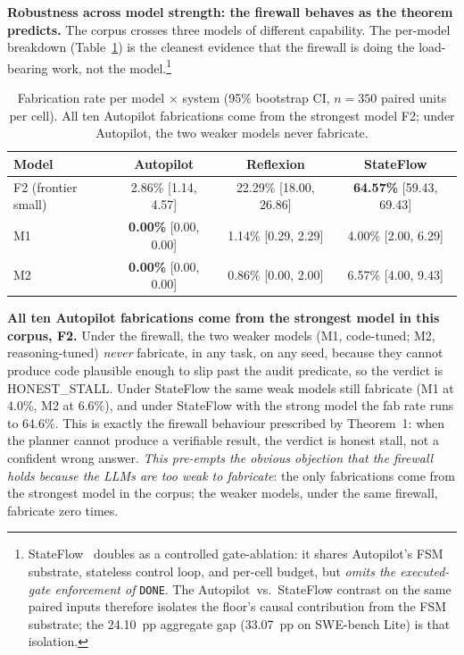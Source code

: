 \textbf{Robustness across model strength: the firewall behaves as the theorem predicts.}
The corpus crosses three models of different capability. The per-model breakdown
(Table~\ref{tab:scaled-permodel}) is the cleanest evidence that the firewall is doing
the load-bearing work, not the model.\footnote{StateFlow~\citep{wu2024stateflow} doubles
as a controlled gate-ablation: it shares Autopilot's FSM substrate, stateless control
loop, and per-cell budget, but \emph{omits the executed-gate enforcement of}
\texttt{DONE}. The Autopilot~vs.~StateFlow contrast on the same paired inputs therefore
isolates the floor's causal contribution from the FSM substrate; the 24.10~pp aggregate
gap (33.07~pp on SWE-bench Lite) is that isolation.}

{\scriptsize\begin{longtable}[]{@{}lccc@{}}
\caption{Fabrication rate per model $\times$ system
(95\% bootstrap CI, $n=350$ paired units per cell). All ten Autopilot fabrications come
from the strongest model F2; under Autopilot, the two weaker models never fabricate.}\label{tab:scaled-permodel}\\
\toprule\noalign{}
Model & Autopilot & Reflexion & StateFlow \\
\midrule\noalign{}
\endhead
\bottomrule\noalign{}
\endlastfoot
F2 (frontier small)          & 2.86\% [1.14, 4.57]    & 22.29\% [18.00, 26.86] & \textbf{64.57\%} [59.43, 69.43] \\
M1     & \textbf{0.00\%} [0.00, 0.00] & 1.14\% [0.29, 2.29]    & 4.00\% [2.00, 6.29] \\
M2      & \textbf{0.00\%} [0.00, 0.00] & 0.86\% [0.00, 2.00]    & 6.57\% [4.00, 9.43] \\
\end{longtable}}

\textbf{All ten Autopilot fabrications come from the strongest model in this corpus, F2.} Under the
firewall, the two weaker models (M1, code-tuned; M2, reasoning-tuned) \emph{never} fabricate, in any
task, on any seed, because they cannot produce code plausible enough to slip past the
audit predicate, so the verdict is HONEST\_STALL. Under StateFlow the same weak models
still fabricate (M1 at 4.0\%, M2 at 6.6\%), and under StateFlow with the strong model
the fab rate runs to 64.6\%. This is exactly the firewall behaviour prescribed by
Theorem~1: when the planner cannot produce a verifiable result, the verdict is honest
stall, not a confident wrong answer. \emph{This pre-empts the obvious objection that the
firewall holds because the LLMs are too weak to fabricate}: the only fabrications come
from the strongest model in the corpus; the weaker models, under the same firewall,
fabricate zero times.

